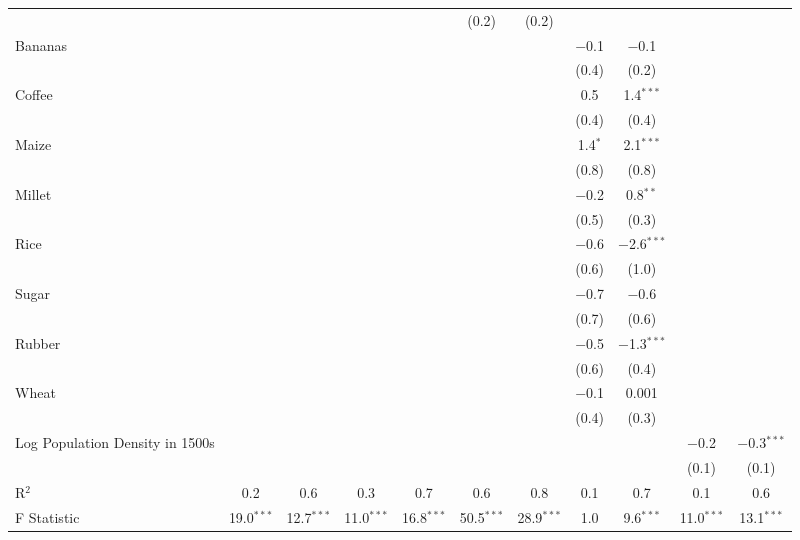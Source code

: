 \begin{table}[!htbp]
\begin{threeparttable}
\begin{tabular}{@{\extracolsep{0pt}}lcccccccccc}
  &  &  &  &  & (0.2) & (0.2) &  &  &  &  \\ 
  Bananas &  &  &  &  &  &  & $-$0.1 & $-$0.1 &  &  \\ 
  &  &  &  &  &  &  & (0.4) & (0.2) &  &  \\ 
  Coffee &  &  &  &  &  &  & 0.5 & 1.4$^{***}$ &  &  \\ 
  &  &  &  &  &  &  & (0.4) & (0.4) &  &  \\ 
  Maize &  &  &  &  &  &  & 1.4$^{*}$ & 2.1$^{***}$ &  &  \\ 
  &  &  &  &  &  &  & (0.8) & (0.8) &  &  \\ 
  Millet &  &  &  &  &  &  & $-$0.2 & 0.8$^{**}$ &  &  \\ 
  &  &  &  &  &  &  & (0.5) & (0.3) &  &  \\ 
  Rice &  &  &  &  &  &  & $-$0.6 & $-$2.6$^{***}$ &  &  \\ 
  &  &  &  &  &  &  & (0.6) & (1.0) &  &  \\ 
  Sugar &  &  &  &  &  &  & $-$0.7 & $-$0.6 &  &  \\ 
  &  &  &  &  &  &  & (0.7) & (0.6) &  &  \\ 
  Rubber &  &  &  &  &  &  & $-$0.5 & $-$1.3$^{***}$ &  &  \\ 
  &  &  &  &  &  &  & (0.6) & (0.4) &  &  \\ 
  Wheat &  &  &  &  &  &  & $-$0.1 & 0.001 &  &  \\ 
  &  &  &  &  &  &  & (0.4) & (0.3) &  &  \\ 
  Log Population Density in 1500s &  &  &  &  &  &  &  &  & $-$0.2 & $-$0.3$^{***}$ \\ 
  &  &  &  &  &  &  &  &  & (0.1) & (0.1) \\ 
R$^{2}$ & 0.2 & 0.6 & 0.3 & 0.7 & 0.6 & 0.8 & 0.1 & 0.7 & 0.1 & 0.6 \\ 
F Statistic & 19.0$^{***}$ & 12.7$^{***}$ & 11.0$^{***}$ & 16.8$^{***}$ & 50.5$^{***}$ & 28.9$^{***}$ & 1.0 & 9.6$^{***}$ & 11.0$^{***}$ & 13.1$^{***}$ \\ 


\end{tabular}
\end{threeparttable}
\end{table}
